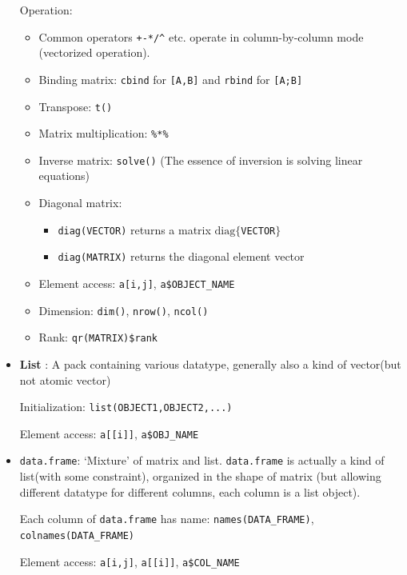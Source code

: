 \begin{itemize}[topsep=2pt,itemsep=0pt]
    Operation:
    \begin{itemize}[topsep=2pt,itemsep=0pt]
        \item Common operators \lstinline|+-*/^| etc. operate in column-by-column mode (vectorized operation).
        \item Binding matrix: \lstinline|cbind| for \lstinline|[A,B]| and \lstinline|rbind| for \lstinline|[A;B]|
        \item Transpose: \lstinline|t()|
        \item Matrix multiplication: \lstinline|%*%|
        \item Inverse matrix: \lstinline|solve()| (The essence of inversion is solving linear equations)
        \item Diagonal matrix:
        \begin{itemize}[topsep=2pt,itemsep=0pt]
            \item \lstinline|diag(VECTOR)| returns a matrix $ \mathrm{diag}\{ $\lstinline|VECTOR|$ \} $
            \item \lstinline|diag(MATRIX)| returns the diagonal element vector
        \end{itemize}
        \item Element access: \lstinline|a[i,j]|, \lstinline|a$OBJECT_NAME|
        \item Dimension: \lstinline|dim()|, \lstinline|nrow()|, \lstinline|ncol()|
        \item Rank: \lstinline|qr(MATRIX)$rank|
    \end{itemize}
    
    \item \textbf{List} : A pack containing various datatype, generally also a kind of vector(but not atomic vector)
    
    Initialization: \lstinline|list(OBJECT1,OBJECT2,...)|

    Element access: \lstinline|a[[i]]|, \lstinline|a$OBJ_NAME|
    \item \lstinline|data.frame|: `Mixture' of matrix and list. \lstinline|data.frame| is actually a kind of list(with some constraint), organized in the shape of matrix (but allowing different datatype for different columns, each column is a list object).
    
    Each column of \lstinline|data.frame| has name: \lstinline|names(DATA_FRAME)|, \lstinline|colnames(DATA_FRAME)|

    Element access: \lstinline|a[i,j]|, \lstinline|a[[i]]|, \lstinline|a$COL_NAME|
\end{itemize}

